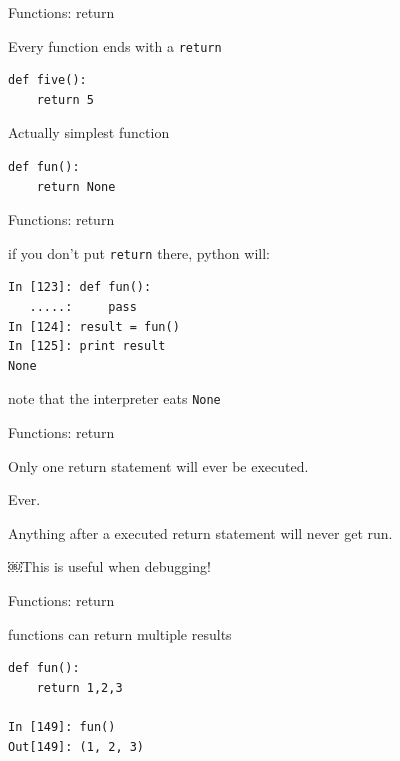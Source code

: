 \documentclass{beamer}
\begin{document}
\begin{frame}[fragile]{Functions: return}

{\Large Every function ends with a \verb+return+}

\begin{verbatim}
def five():
    return 5
\end{verbatim}

{\Large Actually simplest function}
\begin{verbatim}
def fun():
    return None
\end{verbatim}
\end{frame}

\begin{frame}[fragile]{Functions: return}

{\Large if you don't put \verb+return+ there, python will:}

\begin{verbatim}
In [123]: def fun():
   .....:     pass
In [124]: result = fun()
In [125]: print result
None
\end{verbatim}

{\Large note that the interpreter eats \verb+None+}

\end{frame}


\begin{frame}{Functions: return}

\vspace{0.25in}
{\Large Only one return statement will ever be executed.}

\pause
\vspace{0.25in}
{\Large Ever.}

\pause
\vspace{0.25in}
{\Large Anything after a executed return statement will never get run.}

\vspace{0.25in}
{\Large ￼This is useful when debugging! }

\end{frame}


\begin{frame}[fragile]{Functions: return}

{\Large functions can return multiple results}

\begin{verbatim}
def fun():
    return 1,2,3

In [149]: fun()
Out[149]: (1, 2, 3)
\end{verbatim}

\end{frame}
\end{document}
